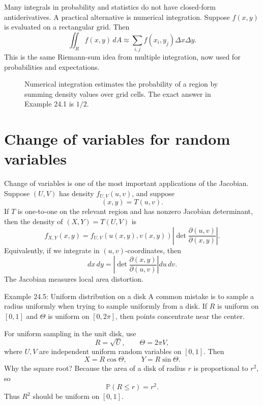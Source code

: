 \documentclass[11pt,oneside]{book}
\newcommand{\Prob}{\mathbb P}
\newcommand{\dd}{\,d}
\begin{document}
Many integrals in probability and statistics do not have closed-form antiderivatives. A practical alternative is numerical integration. Suppose $f(x,y)$ is evaluated on a rectangular grid. Then
\[
\iint_R f(x,y)\dd A\approx \sum_{i,j} f(x_i,y_j)\Delta x\Delta y.
\]
This is the same Riemann-sum idea from multiple integration, now used for probabilities and expectations.

\begin{figure}[H]
\centering
{}
\caption{Numerical integration estimates the probability of a region by summing density values over grid cells. The exact answer in Example 24.1 is $1/2$.}
\end{figure}

\section{Change of variables for random variables}

Change of variables is one of the most important applications of the Jacobian. Suppose $(U,V)$ has density $f_{U,V}(u,v)$, and suppose
\[
(x,y)=T(u,v).
\]
If $T$ is one-to-one on the relevant region and has nonzero Jacobian determinant, then the density of $(X,Y)=T(U,V)$ is
\[
f_{X,Y}(x,y)=f_{U,V}(u(x,y),v(x,y))\left|\det\frac{\partial(u,v)}{\partial(x,y)}\right|.
\]
Equivalently, if we integrate in $(u,v)$-coordinates, then
\[
dx\,dy=\left|\det\frac{\partial(x,y)}{\partial(u,v)}\right|du\,dv.
\]
The Jacobian measures local area distortion.

\begin{examplebox}{Example 24.5: Uniform distribution on a disk}
A common mistake is to sample a radius uniformly when trying to sample uniformly from a disk. If $R$ is uniform on $[0,1]$ and $\Theta$ is uniform on $[0,2\pi]$, then points concentrate near the center.

For uniform sampling in the unit disk, use
\[
R=\sqrt U,\qquad \Theta=2\pi V,
\]
where $U,V$ are independent uniform random variables on $[0,1]$. Then
\[
X=R\cos\Theta,\qquad Y=R\sin\Theta.
\]
Why the square root? Because the area of a disk of radius $r$ is proportional to $r^2$, so
\[
\Prob(R\le r)=r^2.
\]
Thus $R^2$ should be uniform on $[0,1]$.
\end{examplebox}
\end{document}
